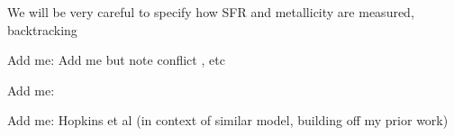 \documentclass[nofootinbib,twocolumn,prd]{emulateapj}
\newcommand\editremark[1]{{\color{red}#1}}
\begin{document}
\begin{abstract}
%

\end{abstract}

%

\maketitle

\editremark{We will be very careful to specify how SFR and metallicity are measured, backtracking}

Add me: \cite{2013ApJ...779..102K}
Add me but note conflict \cite{2015MNRAS.453.4337S}, etc

Add me: \citet{2014ARAA..52..415M}

Add me: Hopkins et al  \cite{2016arXiv160508783L} (in context of similar model, building off my prior work)
\end{document}
